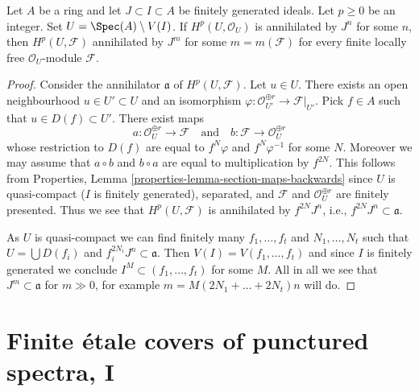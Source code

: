 \begin{lemma}
\label{lemma-annihilate-Hp}
\begin{reference}
\cite[Lemma 1.9]{Bhatt-local}
\end{reference}
Let $A$ be a ring and let $J \subset I \subset A$ be finitely generated ideals.
Let $p \geq 0$ be an integer. Set $U = \Spec(A) \setminus V(I)$. If
$H^p(U, \mathcal{O}_U)$ is annihilated by $J^n$ for some $n$, then
$H^p(U, \mathcal{F})$ annihilated by $J^m$ for some $m = m(\mathcal{F})$
for every finite locally free $\mathcal{O}_U$-module $\mathcal{F}$.
\end{lemma}

\begin{proof}
Consider the annihilator $\mathfrak a$ of $H^p(U, \mathcal{F})$.
Let $u \in U$. There exists an open neighbourhood $u \in U' \subset U$
and an isomorphism
$\varphi : \mathcal{O}_{U'}^{\oplus r} \to \mathcal{F}|_{U'}$.
Pick $f \in A$ such that $u \in D(f) \subset U'$.
There exist maps
$$
a : \mathcal{O}_U^{\oplus r} \longrightarrow \mathcal{F}
\quad\text{and}\quad
b : \mathcal{F} \longrightarrow \mathcal{O}_U^{\oplus r}
$$
whose restriction to $D(f)$ are equal to $f^N \varphi$
and $f^N \varphi^{-1}$ for some $N$. Moreover we may assume that
$a \circ b$ and $b \circ a$ are equal to multiplication by $f^{2N}$.
This follows from Properties, Lemma
\ref{properties-lemma-section-maps-backwards}
since $U$ is quasi-compact ($I$ is finitely generated), separated, and
$\mathcal{F}$ and $\mathcal{O}_U^{\oplus r}$ are finitely presented.
Thus we see that $H^p(U, \mathcal{F})$ is annihilated by
$f^{2N}J^n$, i.e., $f^{2N}J^n \subset \mathfrak a$.

\medskip\noindent
As $U$ is quasi-compact we can find finitely many $f_1, \ldots, f_t$
and $N_1, \ldots, N_t$ such that $U = \bigcup D(f_i)$ and
$f_i^{2N_i}J^n \subset \mathfrak a$. Then $V(I) = V(f_1, \ldots, f_t)$
and since $I$ is finitely generated we conclude
$I^M \subset (f_1, \ldots, f_t)$ for some $M$.
All in all we see that $J^m \subset \mathfrak a$ for
$m \gg 0$, for example $m = M (2N_1 + \ldots + 2N_t) n$  will do.
\end{proof}







\section{Finite \'etale covers of punctured spectra, I}
\label{section-pi1-punctured-spec}

